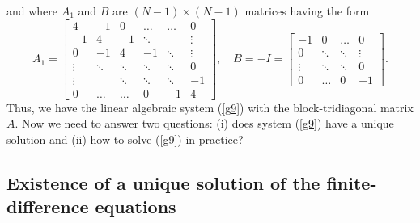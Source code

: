 and where $A_{1}$ and $B$ are $(N-1)\times(N-1)$ matrices having the form
\begin{equation}
A_{1}=\left[
\begin{array}{cccccc}
4 &-1  &0      &\dots  &\dots &0 \\
-1 &4  &-1     &\ddots  &     &\vdots \\
0  &-1 &4      &-1      &\ddots &\vdots \\
\vdots &\ddots &\ddots &\ddots &\ddots &0 \\
\vdots &       &\ddots &\ddots &\ddots &-1 \\
0      &\dots  &\dots  &0      &-1 &4
\end{array}\right], \quad
B=-I=\left[
\begin{array}{cccc}
-1  &0      &\dots  &0 \\
0   &\ddots  &\ddots  &\vdots \\
\vdots  &\ddots  &\ddots  &0 \\
0     &\dots &0  &-1
\end{array}\right]. \label{g11}
\end{equation}
Thus, we have the linear algebraic system (\ref{g9}) with
the block-tridiagonal matrix $A$. Now we need
to answer two questions: (i) does system (\ref{g9}) have a unique solution and (ii) how to solve
(\ref{g9}) in practice?



\subsection{Existence of a unique solution of the finite-difference equations} 

